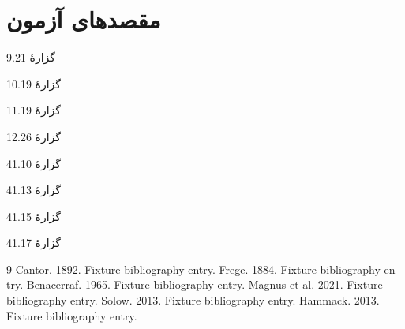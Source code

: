 \documentclass[14pt,oneside,openany]{memoir}
\begin{document}
\chapter*{مقصدهای آزمون}
\hypertarget{fixture.n9.21}{گزارهٔ 9.21}\par
\hypertarget{fixture.n10.19}{گزارهٔ 10.19}\par
\hypertarget{fixture.n11.19}{گزارهٔ 11.19}\par
\hypertarget{fixture.n12.26}{گزارهٔ 12.26}\par
\hypertarget{fixture.n41.10}{گزارهٔ 41.10}\par
\hypertarget{fixture.n41.13}{گزارهٔ 41.13}\par
\hypertarget{fixture.n41.15}{گزارهٔ 41.15}\par
\hypertarget{fixture.n41.17}{گزارهٔ 41.17}\par
\begin{otherlanguage}{english}
\begin{thebibliography}{9}
 Cantor. 1892. Fixture bibliography entry.
 Frege. 1884. Fixture bibliography entry.
 Benacerraf. 1965. Fixture bibliography entry.
 Magnus et al. 2021. Fixture bibliography entry.
 Solow. 2013. Fixture bibliography entry.
 Hammack. 2013. Fixture bibliography entry.
\end{thebibliography}
\end{otherlanguage}
\end{document}
